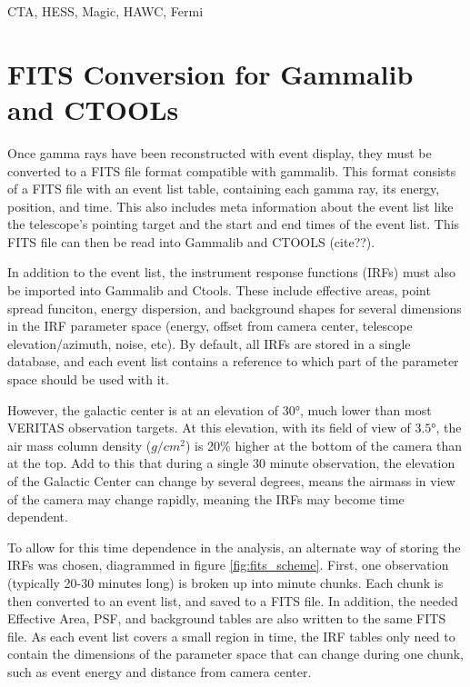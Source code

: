 
CTA, HESS, Magic, HAWC, Fermi

\section{FITS Conversion for Gammalib and CTOOLs}

Once gamma rays have been reconstructed with event display, they must be converted to a FITS file format compatible with gammalib.
This format consists of a FITS file with an event list table, containing each gamma ray, its energy, position, and time.
This also includes meta information about the event list like the telescope's pointing target and the start and end times of the event list.
This FITS file can then be read into Gammalib and CTOOLS (cite??).

In addition to the event list, the instrument response functions (IRFs) must also be imported into Gammalib and Ctools.
These include effective areas, point spread funciton, energy dispersion, and background shapes for several dimensions in the IRF parameter space (energy, offset from camera center, telescope elevation/azimuth, noise, etc).
By default, all IRFs are stored in a single database, and each event list contains a reference to which part of the parameter space should be used with it.

However, the galactic center is at an elevation of $\ang{30}$, much lower than most VERITAS observation targets.
At this elevation, with its field of view of $\ang{3.5}$, the air mass column density ($g/cm^{2}$) is 20\% higher at the bottom of the camera than at the top.
Add to this that during a single 30 minute observation, the elevation of the Galactic Center can change by several degrees, means the airmass in view of the camera may change rapidly, meaning the IRFs may become time dependent.

To allow for this time dependence in the analysis, an alternate way of storing the IRFs was chosen, diagrammed in figure \ref{fig:fits_scheme}.
First, one observation (typically 20-30 minutes long) is broken up into  minute chunks.
Each chunk is then converted to an event list, and saved to a FITS file.
In addition, the needed Effective Area, PSF, and background tables are also written to the same FITS file.
As each event list covers a small region in time, the IRF tables only need to contain the dimensions of the parameter space that can change during one chunk, such as event energy and distance from camera center.

